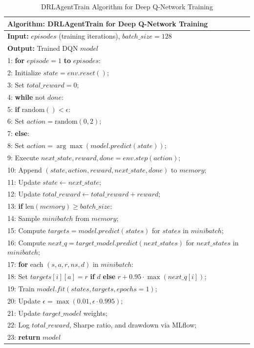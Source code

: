 \begin{table}[h]
\small
\centering
\begin{tabular}{|p{14cm}|}
\hline
\textbf{Algorithm: DRLAgentTrain for Deep Q-Network Training} \\
\hline
\textbf{Input:} $episodes$ (training iterations), $batch\_size=128$ \\
\textbf{Output:} Trained DQN $model$ \\
\hline
1: \textbf{for} $episode = 1$ \textbf{to} $episodes$: \\
2: \quad Initialize $state = env.reset()$; \\
3: \quad Set $total\_reward = 0$; \\
4: \quad \textbf{while} not $done$: \\
5: \quad\quad \textbf{if} $\text{random}() < \epsilon$: \\
6: \quad\quad\quad Set $action = \text{random}(0, 2)$; \\
7: \quad\quad \textbf{else}: \\
8: \quad\quad\quad Set $action = \arg\max(model.predict(state))$; \\
9: \quad\quad Execute $next\_state, reward, done = env.step(action)$; \\
10: \quad\quad Append $(state, action, reward, next\_state, done)$ to $memory$; \\
11: \quad\quad Update $state \leftarrow next\_state$; \\
12: \quad\quad Update $total\_reward \leftarrow total\_reward + reward$; \\
13: \quad\quad \textbf{if} $\text{len}(memory) \geq batch\_size$: \\
14: \quad\quad\quad Sample $minibatch$ from $memory$; \\
15: \quad\quad\quad Compute $targets = model.predict(states)$ for $states$ in $minibatch$; \\
16: \quad\quad\quad Compute $next\_q = target\_model.predict(next\_states)$ for $next\_states$ in $minibatch$; \\
17: \quad\quad\quad \textbf{for} each $(s, a, r, ns, d)$ in $minibatch$: \\
18: \quad\quad\quad\quad Set $targets[i][a] = r$ \textbf{if} $d$ \textbf{else} $r + 0.95 \cdot \max(next\_q[i])$; \\
19: \quad\quad\quad Train $model.fit(states, targets, epochs=1)$; \\
20: \quad\quad Update $\epsilon = \max(0.01, \epsilon \cdot 0.995)$; \\
21: \quad Update $target\_model$ weights; \\
22: \quad Log $total\_reward$, Sharpe ratio, and drawdown via MLflow; \\
23: \textbf{return} $model$ \\
\hline
\end{tabular}
\caption{DRLAgentTrain Algorithm for Deep Q-Network Training}
\label{tab:drlagenttrain_algorithm}
\end{table}

